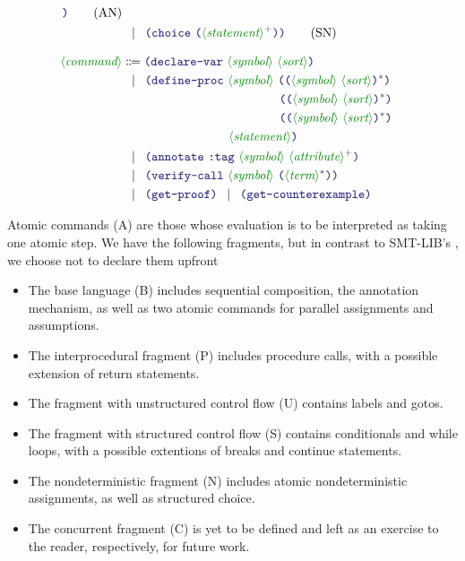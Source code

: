 \documentclass[runningheads]{llncs}
\begin{document}
\begin{align}
        \RP \tag{AN} \\
    & \alt
        \LP \terminal{choice}~
            \LP \nonterminal{statement}\rplus \RP
        \RP \tag{SN} \\[8pt]
%
\nonterminal{command}
    & \Coloneqq
        \LP \terminal{declare-var}~
            \nonterminal{symbol}~\nonterminal{sort}
        \RP \notag \\
    & \alt
        \LP \terminal{define-proc}~
            \nonterminal{symbol}~
            \LP \LP \nonterminal{symbol}~\nonterminal{sort}\RP\rstar \RP \notag \\
    & \hspace*{4.42cm} \LP \LP \nonterminal{symbol}~\nonterminal{sort}\RP\rstar \RP \notag \\
    & \hspace*{4.42cm} \LP \LP \nonterminal{symbol}~\nonterminal{sort}\RP\rstar \RP
        \notag \\
    & \hspace*{3.0cm} \nonterminal{statement} \notag \RP \\
    & \alt
        \LP \terminal{annotate}~
            \terminal{:tag}~\nonterminal{symbol}~
            \nonterminal{attribute}\rplus
        \RP \notag \\
    & \alt
        \LP \terminal{verify-call}~
            \nonterminal{symbol}~
            \LP \nonterminal{term}\rstar \RP
        \RP \notag \\
    & \alt
        \LP \terminal{get-proof} \RP \alt \LP \terminal{get-counterexample} \RP \notag
\end{align}

\noindent
Atomic commands (A) are those whose evaluation is to be interpreted
as taking one atomic step.
We have the following fragments, but in contrast to SMT-LIB's ,
we choose not to declare them upfront
\begin{itemize}
\item The base language (B) includes sequential composition,
      the annotation mechanism,
      as well as two atomic commands for
      parallel assignments and assumptions.
\item The interprocedural fragment (P) includes procedure calls,
      with a possible extension of return statements.
\item The fragment with unstructured control flow (U)
      contains labels and gotos.
\item The fragment with structured control flow (S)
      contains conditionals and while loops,
      with a possible extentions of breaks and continue statements.
\item The nondeterministic fragment (N)
      includes atomic nondeterministic assignments,
      as well as structured choice.
\item The concurrent fragment (C) is yet to be defined
      and left as an exercise to the reader, respectively,
      for future work.
\end{itemize}
\end{document}
